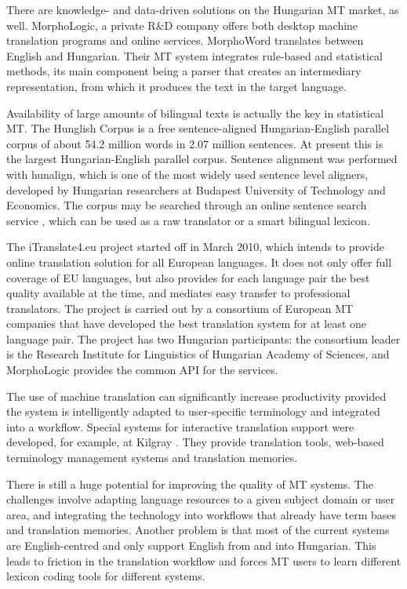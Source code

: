 \begin{multicols}{2}
  There are knowledge- and data-driven solutions on the Hungarian MT market, as well. MorphoLogic, a private R\&D company offers both desktop machine translation programs and online services. MorphoWord translates between English and Hungarian. Their MT system integrates rule-based and statistical methods, its main component being a parser that creates an intermediary representation, from which it produces the text in the target language.

  Availability of large amounts of bilingual texts is actually the key in statistical MT. The Hunglish Corpus is a free sentence-aligned Hungarian-English parallel corpus of about 54.2 million words in 2.07 million sentences. At present this is the largest Hungarian-English parallel corpus. Sentence alignment was performed with hunalign, which is one of the most widely used sentence level aligners, developed by Hungarian researchers at Budapest University of Technology and Economics. The corpus may be searched through an online sentence search service \cite{hunglish}, which can be used as a raw translator or a smart bilingual lexicon.

  The iTranslate4.eu \cite{it4eu} project started off in March 2010, which intends to provide online translation solution for all European languages. It does not only offer full coverage of EU languages, but also provides for each language pair the best quality available at the time, and mediates easy transfer to professional translators. The project is carried out by a consortium of European MT companies that have developed the best translation system for at least one language pair. The project has two Hungarian participants: the consortium leader is the Research Institute for Linguistics of Hungarian Academy of Sciences, and MorphoLogic provides the common API for the services.

  The use of machine translation can significantly increase productivity provided the system is intelligently adapted to user-specific terminology and integrated into a workflow. Special systems for interactive translation support were developed, for example, at Kilgray \cite{memoq}. They provide translation tools, web-based terminology management systems and translation memories.

  There is still a huge potential for improving the quality of MT systems. The challenges involve adapting language resources to a given subject domain or user area, and integrating the technology into workflows that already have term bases and translation memories. Another problem is that most of the current systems are English-centred and only support English from and into Hungarian. This leads to friction in the translation workflow and forces MT users to learn different lexicon coding tools for different systems.


\end{multicols}
